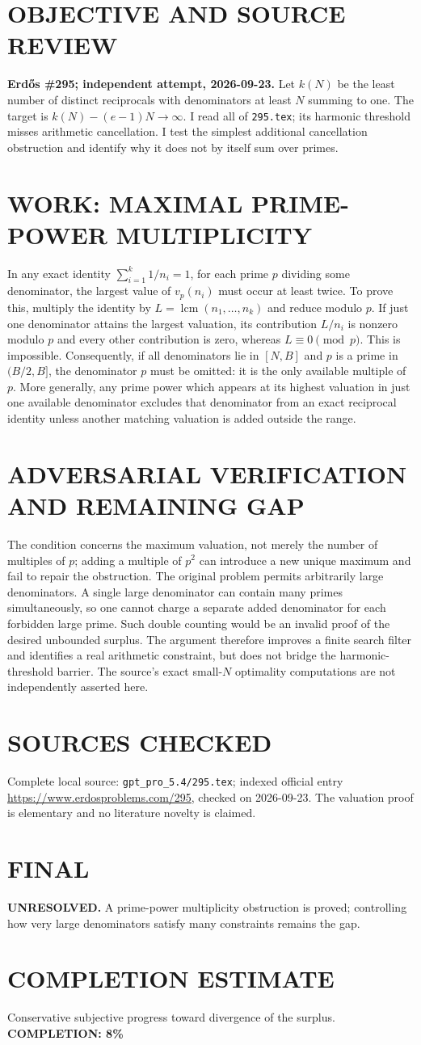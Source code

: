 \section{OBJECTIVE AND SOURCE REVIEW}
\textbf{Erd\H{o}s \#295; independent attempt, 2026-09-23.}
Let $k(N)$ be the least number of distinct reciprocals with denominators at least $N$ summing to one. The target is $k(N)-(e-1)N\to\infty$. I read all of \texttt{295.tex}; its harmonic threshold misses arithmetic cancellation. I test the simplest additional cancellation obstruction and identify why it does not by itself sum over primes.
\section{WORK: MAXIMAL PRIME-POWER MULTIPLICITY}
In any exact identity $\sum_{i=1}^k1/n_i=1$, for each prime $p$ dividing some denominator, the largest value of $v_p(n_i)$ must occur at least twice. To prove this, multiply the identity by $L=\operatorname{lcm}(n_1,\ldots,n_k)$ and reduce modulo $p$. If just one denominator attains the largest valuation, its contribution $L/n_i$ is nonzero modulo $p$ and every other contribution is zero, whereas $L\equiv0\pmod p$. This is impossible.
Consequently, if all denominators lie in $[N,B]$ and $p$ is a prime in $(B/2,B]$, the denominator $p$ must be omitted: it is the only available multiple of $p$. More generally, any prime power which appears at its highest valuation in just one available denominator excludes that denominator from an exact reciprocal identity unless another matching valuation is added outside the range.
\section{ADVERSARIAL VERIFICATION AND REMAINING GAP}
The condition concerns the maximum valuation, not merely the number of multiples of $p$; adding a multiple of $p^2$ can introduce a new unique maximum and fail to repair the obstruction. The original problem permits arbitrarily large denominators. A single large denominator can contain many primes simultaneously, so one cannot charge a separate added denominator for each forbidden large prime. Such double counting would be an invalid proof of the desired unbounded surplus. The argument therefore improves a finite search filter and identifies a real arithmetic constraint, but does not bridge the harmonic-threshold barrier. The source's exact small-$N$ optimality computations are not independently asserted here.
\section{SOURCES CHECKED}
Complete local source: \texttt{gpt\_pro\_5.4/295.tex}; indexed official entry \url{https://www.erdosproblems.com/295}, checked on 2026-09-23. The valuation proof is elementary and no literature novelty is claimed.
\section{FINAL}
\textbf{UNRESOLVED.} A prime-power multiplicity obstruction is proved; controlling how very large denominators satisfy many constraints remains the gap.
\section{COMPLETION ESTIMATE}
Conservative subjective progress toward divergence of the surplus.
\textbf{COMPLETION: 8\%}
